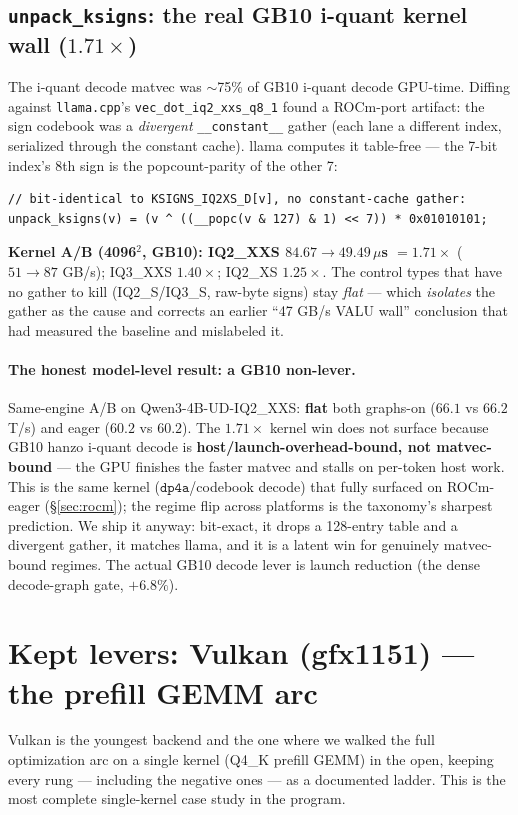 \documentclass[11pt]{article}
\newcommand{\x}{\ensuremath{\times}}
\newcommand{\dpa}{\texttt{dp4a}}
\begin{document}
\subsection{\texttt{unpack\_ksigns}: the real GB10 i-quant kernel wall ($1.71\x$)}
The i-quant decode matvec was $\sim$75\% of GB10 i-quant decode GPU-time. Diffing against
\texttt{llama.cpp}'s \texttt{vec\_dot\_iq2\_xxs\_q8\_1} found a ROCm-port artifact: the sign
codebook was a \emph{divergent} \texttt{\_\_constant\_\_} gather (each lane a different index,
serialized through the constant cache). llama computes it table-free --- the 7-bit index's 8th sign
is the popcount-parity of the other 7:
\begin{lstlisting}[language=CUDAC]
// bit-identical to KSIGNS_IQ2XS_D[v], no constant-cache gather:
unpack_ksigns(v) = (v ^ ((__popc(v & 127) & 1) << 7)) * 0x01010101;
\end{lstlisting}
\textbf{Kernel A/B (4096$^2$, GB10): IQ2\_XXS $84.67\to49.49\,\mu$s $=1.71\x$} ($51\to87$ GB/s);
IQ3\_XXS $1.40\x$; IQ2\_XS $1.25\x$. The control types that have no gather to kill (IQ2\_S/IQ3\_S,
raw-byte signs) stay \emph{flat} --- which \emph{isolates} the gather as the cause and corrects an
earlier ``47 GB/s VALU wall'' conclusion that had measured the baseline and mislabeled it.

\paragraph{The honest model-level result: a GB10 non-lever.} Same-engine A/B on
Qwen3-4B-UD-IQ2\_XXS: \textbf{flat} both graphs-on ($66.1$ vs $66.2$ T/s) and eager ($60.2$ vs
$60.2$). The $1.71\x$ kernel win does not surface because GB10 hanzo i-quant decode is
\textbf{host/launch-overhead-bound, not matvec-bound} --- the GPU finishes the faster matvec and
stalls on per-token host work. This is the same kernel ($\dpa$/codebook decode) that fully surfaced
on ROCm-eager (\S\ref{sec:rocm}); the regime flip across platforms is the taxonomy's sharpest
prediction. We ship it anyway: bit-exact, it drops a 128-entry table and a divergent gather, it
matches llama, and it is a latent win for genuinely matvec-bound regimes. The actual GB10 decode
lever is launch reduction (the dense decode-graph gate, $+6.8\%$).

\section{Kept levers: Vulkan (gfx1151) --- the prefill GEMM arc}
\label{sec:vulkan}
Vulkan is the youngest backend and the one where we walked the full optimization arc on a single
kernel (Q4\_K prefill GEMM) in the open, keeping every rung --- including the negative ones --- as
a documented ladder. This is the most complete single-kernel case study in the program.
\end{document}

